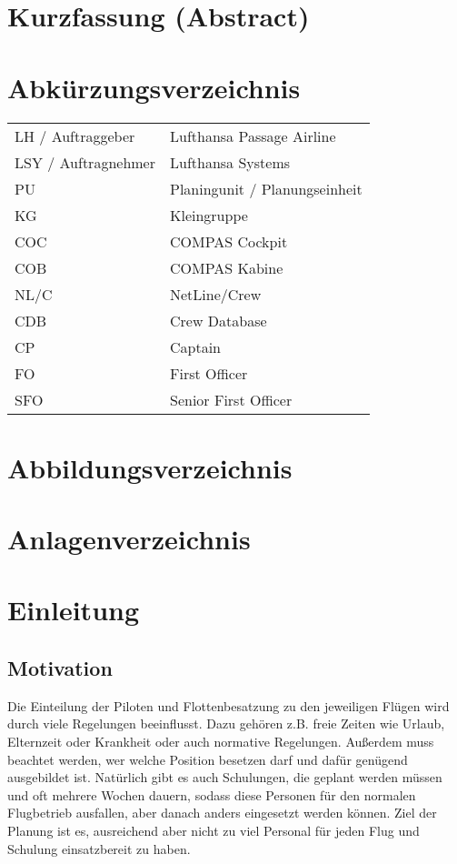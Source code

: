\documentclass [12pt, a4paper, oneside, titlepage, ngerman]{article}
\begin{document}
\tableofcontents
\newpage


\section*{Kurzfassung (Abstract)}
\newpage

\section*{Abkürzungsverzeichnis}
\begin{table}[h!]
  \begin{tabular}{ll}
LH / Auftraggeber & Lufthansa Passage Airline \\
LSY / Auftragnehmer & Lufthansa Systems \\
PU & Planingunit / Planungseinheit \\
KG & Kleingruppe \\
COC & COMPAS Cockpit \\
COB & COMPAS Kabine \\
NL/C & NetLine/Crew \\
CDB & Crew Database \\
CP & Captain \\
FO & First Officer \\
SFO & Senior First Officer\

\end{tabular}
\end{table}
\newpage

\section*{Abbildungsverzeichnis}
\newpage

\section*{Anlagenverzeichnis}
\newpage

\setcounter{page}{1}
\section{Einleitung }
\subsection {Motivation}
Die Einteilung der Piloten und Flottenbesatzung zu den jeweiligen Flügen wird durch viele Regelungen beeinflusst. Dazu gehören z.B. freie Zeiten wie Urlaub, Elternzeit oder Krankheit oder auch normative Regelungen. Außerdem muss beachtet werden, wer welche Position besetzen darf und dafür genügend ausgebildet ist. Natürlich gibt es auch Schulungen, die geplant werden müssen und oft mehrere Wochen dauern, sodass diese Personen für den normalen Flugbetrieb ausfallen, aber danach anders eingesetzt werden können. Ziel der Planung ist es, ausreichend aber nicht zu viel Personal für jeden Flug und Schulung einsatzbereit zu haben.
\end{document}
